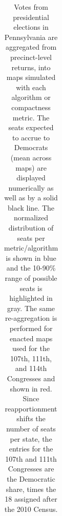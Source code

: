 \begin{table}
\begin{tabular}{l rm{7em} rm{7em} rm{7em} rm{7em}}
\hline \hline
\end{tabular}
\caption{Votes from presidential elections in Pennsylvania are aggregated from precinct-level returns, into maps simulated with each algorithm or compactness metric. 
             The seats expected to accrue to Democrats (mean across maps) are displayed numerically as well as by a solid black line.
             The normalized distribution of seats per metric/algorithm is shown in blue and the 10-90\% range of possible seats is highlighted in gray.
             The same re-aggregation is performed for enacted maps used for the 107th, 111th, and 114th Congresses and shown in red.
             Since reapportionment shifts the number of seats per state,
               the entries for the 107th and 111th Congresses are the Democratic share,
               times the 18 assigned after the 2010 Census.
             }\label{tab:PA_seats}
\end{table}
 